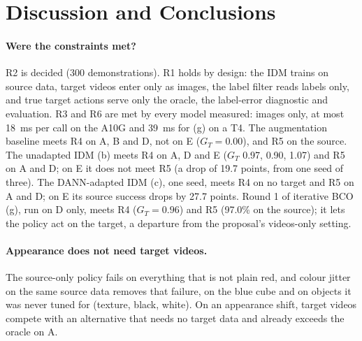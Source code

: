 \documentclass{article}
\begin{document}
\clearpage
\section{Discussion and Conclusions}
\label{sec:discussion}

\paragraph{Were the constraints met?}
R2 is decided (300 demonstrations). R1 holds by design: the IDM trains on source data,
target videos enter only as images, the label filter reads labels only, and true target
actions serve only the oracle, the label-error diagnostic and evaluation. R3 and R6 are
met by every model measured: images only, at most 18~ms per call on the A10G and 39~ms
for (g) on a T4. The augmentation
baseline meets R4 on A, B and D, not on E ($G_T = 0.00$), and R5 on the source. The
unadapted IDM (b) meets R4 on A, D and E ($G_T$ 0.97, 0.90, 1.07) and R5 on A and D; on E
it does not meet R5 (a drop of 19.7 points, from one seed of three). The DANN-adapted IDM
(c), one seed, meets R4 on no target and R5 on A and D; on E its source success drops by
27.7 points. Round 1 of iterative BCO (g), run on D only, meets R4 ($G_T = 0.96$) and R5
(97.0\% on the source); it lets the policy act on the target, a departure from the
proposal's videos-only setting.

\paragraph{Appearance does not need target videos.}
The source-only policy fails on everything that is not plain red, and colour jitter on
the same source data removes that failure, on the blue cube and on objects it was never
tuned for (texture, black, white). On an appearance shift, target videos compete with an
alternative that needs no target data and already exceeds the oracle on A.
\end{document}
